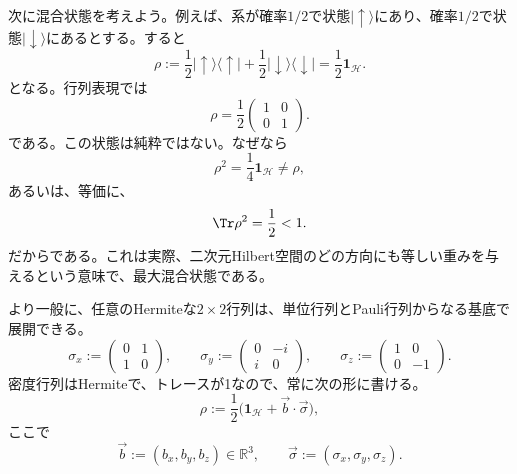 \documentclass[a4paper,11pt,oneside]{article}
\theoremstyle{definition}
\numberwithin{equation}{section}
\begin{document}
次に混合状態を考えよう。例えば、系が確率$1/2$で状態$|\uparrow\rangle$にあり、確率$1/2$で状態$|\downarrow\rangle$にあるとする。すると
\begin{equation}
\rho
:= \frac12 |\uparrow\rangle\langle\uparrow|
+\frac12 |\downarrow\rangle\langle\downarrow|
= \frac12 \mathbf{1}_{\mathcal H} .
\end{equation}
となる。行列表現では
\begin{equation}
\rho =
\frac12
\begin{pmatrix}
1 & 0 \\
0 & 1
\end{pmatrix} .
\end{equation}
である。この状態は純粋ではない。なぜなら
\begin{equation}
\rho^{2}=\frac14 \mathbf{1}_{\mathcal H}\neq \rho ,
\end{equation}
あるいは、等価に、
\begin{equation}
\Tr \rho^{2}=\frac12 <1 .
\end{equation}
だからである。これは実際、二次元Hilbert空間のどの方向にも等しい重みを与えるという意味で、最大混合状態である。



より一般に、任意のHermiteな$2\times 2$行列は、単位行列とPauli行列からなる基底で展開できる。
\begin{equation}
\sigma_{x}:=
\begin{pmatrix}
0 & 1 \\
1 & 0
\end{pmatrix},
\qquad
\sigma_{y}:=
\begin{pmatrix}
0 & -i \\
i & 0
\end{pmatrix},
\qquad
\sigma_{z}:=
\begin{pmatrix}
1 & 0 \\
0 & -1
\end{pmatrix}.
\end{equation}
密度行列はHermiteで、トレースが1なので、常に次の形に書ける。
\begin{equation}
\rho
:= \frac12 \bigl(\mathbf{1}_{\mathcal H}+\vec b\cdot \vec \sigma\bigr) ,
\end{equation}
ここで
\begin{equation}
\vec b := (b_x,b_y,b_z)\in \mathbb{R}^{3},
\qquad
\vec \sigma := (\sigma_x,\sigma_y,\sigma_z) .
\end{equation}
\end{document}
